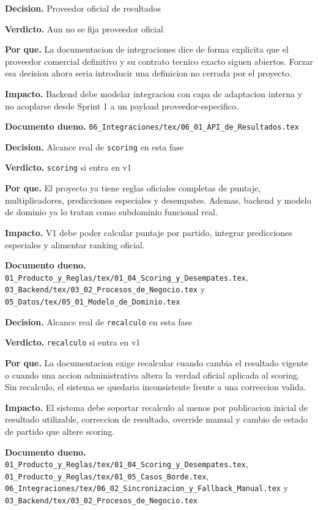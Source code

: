 \begin{docnote}
\textbf{Decision.} Proveedor oficial de resultados

\textbf{Verdicto.} Aun no se fija proveedor oficial

\textbf{Por que.} La documentacion de integraciones dice de forma explicita que el proveedor comercial definitivo y su contrato tecnico exacto siguen abiertos. Forzar esa decision ahora seria introducir una definicion no cerrada por el proyecto.

\textbf{Impacto.} Backend debe modelar integracion con capa de adaptacion interna y no acoplarse desde Sprint 1 a un payload proveedor-especifico.

\textbf{Documento dueno.} \texttt{06\_Integraciones/tex/06\_01\_API\_de\_Resultados.tex}
\end{docnote}

\begin{docnote}
\textbf{Decision.} Alcance real de \texttt{scoring} en esta fase

\textbf{Verdicto.} \texttt{scoring} si entra en v1

\textbf{Por que.} El proyecto ya tiene reglas oficiales completas de puntaje, multiplicadores, predicciones especiales y desempates. Ademas, backend y modelo de dominio ya lo tratan como subdominio funcional real.

\textbf{Impacto.} V1 debe poder calcular puntaje por partido, integrar predicciones especiales y alimentar ranking oficial.

\textbf{Documento dueno.} \texttt{01\_Producto\_y\_Reglas/tex/01\_04\_Scoring\_y\_Desempates.tex}, \texttt{03\_Backend/tex/03\_02\_Procesos\_de\_Negocio.tex} y \texttt{05\_Datos/tex/05\_01\_Modelo\_de\_Dominio.tex}
\end{docnote}

\begin{docnote}
\textbf{Decision.} Alcance real de \texttt{recalculo} en esta fase

\textbf{Verdicto.} \texttt{recalculo} si entra en v1

\textbf{Por que.} La documentacion exige recalcular cuando cambia el resultado vigente o cuando una accion administrativa altera la verdad oficial aplicada al scoring. Sin recalculo, el sistema se quedaria inconsistente frente a una correccion valida.

\textbf{Impacto.} El sistema debe soportar recalculo al menos por publicacion inicial de resultado utilizable, correccion de resultado, override manual y cambio de estado de partido que altere scoring.

\textbf{Documento dueno.} \texttt{01\_Producto\_y\_Reglas/tex/01\_04\_Scoring\_y\_Desempates.tex}, \texttt{01\_Producto\_y\_Reglas/tex/01\_05\_Casos\_Borde.tex}, \texttt{06\_Integraciones/tex/06\_02\_Sincronizacion\_y\_Fallback\_Manual.tex} y \texttt{03\_Backend/tex/03\_02\_Procesos\_de\_Negocio.tex}
\end{docnote}

